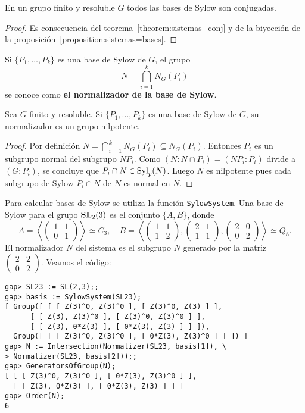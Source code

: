 \begin{corollary}
	En un grupo finito y resoluble $G$ todos las bases de Sylow son conjugadas.
\end{corollary}

\begin{proof}
	Es consecuencia del teorema~\ref{theorem:sistemas_conj} y 
	de la biyección de la proposición~\ref{proposition:sistemas=bases}.
\end{proof}

Si $\{P_1,\dots,P_k\}$ es una base de Sylow de $G$,
el grupo
\[
	N=\bigcap_{i=1}^k N_G(P_i)
\]
se conoce como \textbf{el normalizador de la base de Sylow}. 

\begin{theorem}
	Sea $G$ finito y resoluble. Si $\{P_1,\dots,P_k\}$ es una base de Sylow de
	$G$, su normalizador es un grupo nilpotente. 
\end{theorem}

\begin{proof}
	Por definición $N=\bigcap_{i=1}^k N_G(P_i)\subseteq N_G(P_i)$. Entonces
	$P_i$ es un subgrupo normal del subgrupo $NP_i$.  Como $(N:N\cap
	P_i)=(NP_i:P_i)$ divide a $(G:P_i)$, se concluye que $P_i\cap
	N\in\mathrm{Syl}_p(N)$.  Luego $N$ es nilpotente pues cada subgrupo de Sylow $P_i\cap N$ de $N$ es normal en
	$N$.
\end{proof}

\begin{example}
	Para calcular bases de Sylow se utiliza la función \lstinline{SylowSystem}.
	Una base de Sylow para el grupo $\mathbf{SL}_2(3)$ es el conjunto
	$\{A,B\}$, donde 
	\[
	A=\left\langle \begin{pmatrix}
		1 & 1\\
		0 & 1
	\end{pmatrix}\right\rangle\simeq C_3,\quad
	B=\left\langle \begin{pmatrix}
		1 & 1\\
		1 & 2
	\end{pmatrix},
	\begin{pmatrix}
		2 & 1\\
		1 & 1
	\end{pmatrix},
	\begin{pmatrix}
		2 & 0\\
		0 & 2
	\end{pmatrix}\right\rangle\simeq Q_8.
	\]
	El normalizador $N$ del sistema es el subgrupo $N$ generado por
	la matriz $\begin{pmatrix} 2 & 2\\0 & 2\end{pmatrix}$. Veamos el código:
\begin{lstlisting}
gap> SL23 := SL(2,3);;
gap> basis := SylowSystem(SL23);
[ Group([ [ [ Z(3)^0, Z(3)^0 ], [ Z(3)^0, Z(3) ] ], 
      [ [ Z(3), Z(3)^0 ], [ Z(3)^0, Z(3)^0 ] ], 
      [ [ Z(3), 0*Z(3) ], [ 0*Z(3), Z(3) ] ] ]), 
  Group([ [ [ Z(3)^0, Z(3)^0 ], [ 0*Z(3), Z(3)^0 ] ] ]) ]
gap> N := Intersection(Normalizer(SL23, basis[1]), \
> Normalizer(SL23, basis[2]));;
gap> GeneratorsOfGroup(N);
[ [ [ Z(3)^0, Z(3)^0 ], [ 0*Z(3), Z(3)^0 ] ], 
  [ [ Z(3), 0*Z(3) ], [ 0*Z(3), Z(3) ] ] ]
gap> Order(N);
6
\end{lstlisting}
\end{example}

